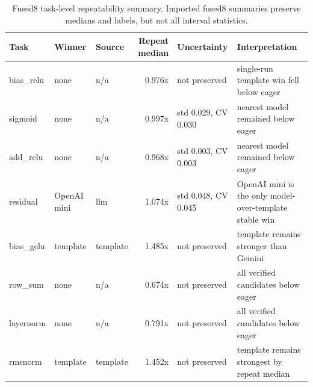 \begin{table}[htbp]
\centering
\caption{Fused8 task-level repeatability summary. Imported fused8 summaries preserve medians and labels, but not all interval statistics.}
\label{tab:fused8-task-appendix}
\scriptsize
\begin{tabularx}{\linewidth}{l l l r l X}
\toprule
Task & Winner & Source & Repeat median & Uncertainty & Interpretation \\
\midrule
bias\_relu & none & n/a & 0.976x & not preserved & single-run template win fell below eager \\
sigmoid & none & n/a & 0.997x & std 0.029, CV 0.030 & nearest model remained below eager \\
add\_relu & none & n/a & 0.968x & std 0.003, CV 0.003 & nearest model remained below eager \\
residual & OpenAI mini & llm & 1.074x & std 0.048, CV 0.045 & OpenAI mini is the only model-over-template stable win \\
bias\_gelu & template & template & 1.485x & not preserved & template remains stronger than Gemini \\
row\_sum & none & n/a & 0.674x & not preserved & all verified candidates below eager \\
layernorm & none & n/a & 0.791x & not preserved & all verified candidates below eager \\
rmsnorm & template & template & 1.452x & not preserved & template remains strongest by repeat median \\
\bottomrule
\end{tabularx}
\end{table}
